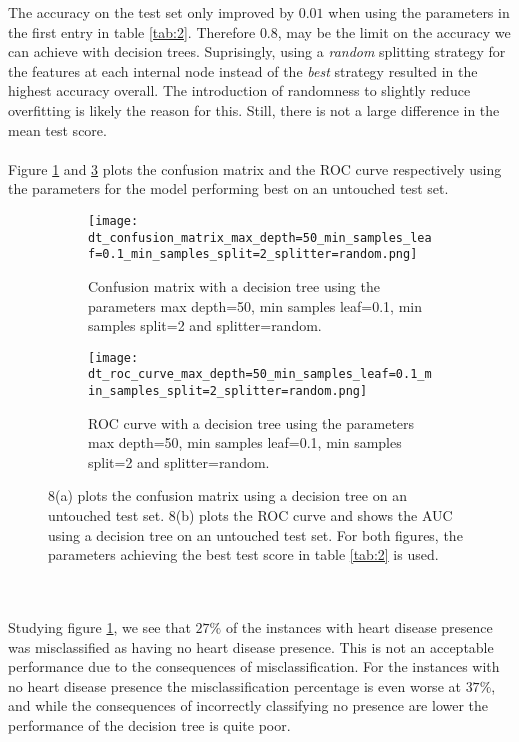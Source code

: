 \documentclass[a4paper,twocolumn]{article}
\begin{document}
The accuracy on the test set only improved by $0.01$ when using the parameters in the first entry in table \ref{tab:2}. Therefore $0.8$, may be the limit on the accuracy we can achieve with decision trees. Suprisingly, using a \textit{random} splitting strategy for the features at each internal node instead of the \textit{best} strategy resulted in the highest accuracy overall. The introduction of randomness to slightly reduce overfitting is likely the reason for this. Still, there is not a large difference in the mean test score.\\
\\
Figure \ref{fig:8a} and \ref{fig:8b} plots the confusion matrix and the ROC curve respectively using the parameters for the model performing best on an untouched test set. \\
\begin{figure}[ht!]
    \centering
    \begin{subfigure}[b]{\columnwidth}
        \texttt{[image: dt\_confusion\_matrix\_max\_depth=50\_min\_samples\_leaf=0.1\_min\_samples\_split=2\_splitter=random.png]}
        \caption{Confusion matrix with a decision tree using the parameters max depth=50, min samples leaf=0.1, min samples split=2 and splitter=random.}
        \label{fig:8a}
    \end{subfigure}
    
    \begin{subfigure}[b]{\columnwidth}
        \texttt{[image: dt\_roc\_curve\_max\_depth=50\_min\_samples\_leaf=0.1\_min\_samples\_split=2\_splitter=random.png]}
        \caption{ROC curve with a decision tree using the parameters max depth=50, min samples leaf=0.1, min samples split=2 and splitter=random.}
        \label{fig:8b}
    \end{subfigure}
    \caption{8(a) plots the confusion matrix using a decision tree on an untouched test set. 8(b) plots the ROC curve and shows the AUC using a decision tree on an untouched test set. For both figures, the parameters achieving the best test score in table \ref{tab:2} is used.}
\end{figure}\\
\\
Studying figure \ref{fig:8a}, we see that $27\%$ of the instances with heart disease presence was misclassified as having no heart disease presence. This is not an acceptable performance due to the consequences of misclassification. For the instances with no heart disease presence the misclassification percentage is even worse at $37\%$, and while the consequences of incorrectly classifying no presence are lower the performance of the decision tree is quite poor.\\
\end{document}

